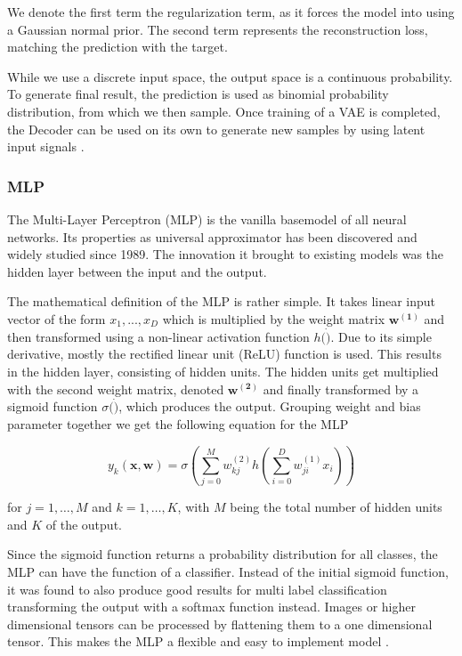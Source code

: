 We denote the first term the regularization term, as it forces the model into using a Gaussian normal prior. The second term represents the reconstruction loss, matching the prediction with the target.

While we use a discrete input space, the output space is a continuous probability. To generate final result, the prediction is used as binomial probability distribution, from which we then sample. Once training  of a VAE is completed, the Decoder can be used on its own to generate new samples by using latent input signals \cite{kingma_auto-encoding_2014}.


\subsubsection{MLP}
\label{ssec:mlp}
The Multi-Layer Perceptron (MLP) is the vanilla basemodel of all neural networks.
Its properties as universal approximator has been discovered and widely studied since 1989. The innovation it brought to existing models was the hidden layer between the input and the output.

The mathematical definition of the MLP is rather simple. It takes linear input vector of the form $x_1,...,x_D$ which is multiplied by the weight matrix $\mathbf{w^{(1)}}$ and then transformed using a non-linear activation function $h(\dot)$. Due to its simple derivative, mostly the rectified linear unit (ReLU) function is used. This results in the hidden layer, consisting of hidden units. The hidden units get multiplied with the second weight matrix, denoted $\mathbf{w^{(2)}}$ and finally transformed by a sigmoid function $\sigma(\dot)$, which produces the output. Grouping weight and bias parameter together we get the following equation for the MLP

\begin{equation}
    y_{k}(\mathbf{x}, \mathbf{w})=\sigma\left(\sum_{j=0}^{M} w_{k j}^{(2)} h\left(\sum_{i=0}^{D} w_{j i}^{(1)} x_{i}\right)\right)
\end{equation}

for $j=1, \ldots, M$ and $k=1, \ldots, K$, with $M$ being the total number of hidden units and $K$ of the output.


Since the sigmoid function returns a probability distribution for all classes, the MLP can have the function of a classifier. Instead of the initial sigmoid function, it was found to also produce good results for multi label classification transforming the output with a softmax function instead. Images or higher dimensional tensors can be processed by flattening them to a one dimensional tensor. This makes the MLP a flexible and easy to implement model \cite{bishop_pattern_2006}.


